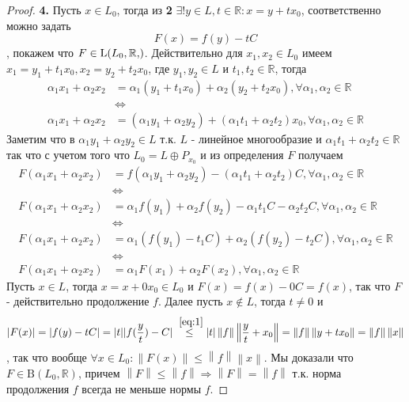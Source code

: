 \documentclass[12pt,a4paper]{article}
\theoremstyle{definition}
\newcommand{\Real}{\mathbb{R}}
\newcommand{\norm}[1]{\left\lVert#1\right\rVert}
\newcommand{\bounded}[2]{\textrm{B}(#1, #2)}
\newcommand{\linear}[2]{\textrm{L}(#1, #2)}
\begin{document}
\begin{proof}
	\textbf{4.} Пусть $x \in L_0$, тогда из \textbf{2} $\exists!{y \in L, t \in \Real}: x = y + tx_0$, соответственно можно задать $$F(x) = f(y) - tC$$, покажем что $F \in \linear{L_0, \Real}$. Действительно для $x_1, x_2 \in L_0$ имеем \newline $x_1 = y_1 + t_1 x_0, x_2 = y_2 + t_2 x_0$, где $y_1, y_2 \in L$ и $t_1, t_2 \in \Real$, тогда
	\begin{align*}
		\alpha_1 x_1 + \alpha_2 x_2 &= \alpha_1 (y_1 + t_1 x_0) + \alpha_2 (y_2 + t_2 x_0), \forall \alpha_1, \alpha_2 \in \Real  \\
		&\Leftrightarrow \\
		\alpha_1 x_1 + \alpha_2 x_2 &= (\alpha_1 y_1 + \alpha_2 y_2) + (\alpha_1 t_1 + \alpha_2 t_2)x_0, \forall \alpha_1, \alpha_2 \in \Real
	\end{align*}
	 Заметим что в $\alpha_1 y_1 + \alpha_2 y_2 \in L$ т.к. $L$ - линейное многообразие \newline и $\alpha_1 t_1 + \alpha_2 t_2 \in \Real$ так что с учетом того что $L_0 = L \oplus P_{x_0}$ и из определения $F$ получаем
	\begin{align*}
		F(\alpha_1 x_1 + \alpha_2 x_2) &= f(\alpha_1 y_1 + \alpha_2 y_2) - (\alpha_1 t_1 + \alpha_2 t_2)C, \forall \alpha_1, \alpha_2 \in \Real \\ &\Leftrightarrow \\    
		F(\alpha_1 x_1 + \alpha_2 x_2) &= \alpha_1 f(y_1) + \alpha_2 f(y_2) - \alpha_1 t_1 C - \alpha_2 t_2 C, \forall \alpha_1, \alpha_2 \in \Real \\ &\Leftrightarrow \\
		F(\alpha_1 x_1 + \alpha_2 x_2) &= \alpha_1 (f(y_1) - t_1 C) + \alpha_2 (f(y_2) - t_2 C), \forall \alpha_1, \alpha_2 \in \Real \\ &\Leftrightarrow \\
		F(\alpha_1 x_1 + \alpha_2 x_2) &= \alpha_1 F(x_1) + \alpha_2 F(x_2), \forall \alpha_1, \alpha_2 \in \Real
	\end{align*}
	Пусть $x\in L$, тогда $x = x + 0x_0 \in L_0$ и $F(x) = f(x) - 0C = f(x)$, так что $F$ - действительно продолжение $f$. Далее пусть $x \notin L$, тогда $t \neq 0$ и 
	$$|F(x)| = |f(y) - tC| = |t||f(\frac{y}{t}) - C| \overset{~\eqref{eq:1}}{\leq} |t|\norm{f}\norm{\frac{y}{t} + x_0} = \norm{f}\norm{y + tx_0} = \norm{f}\norm{x}$$, так что вообще $\forall x \in L_0: \norm{F(x)} \leq \norm{f}\norm{x}$. Мы доказали что $F \in \bounded{L_0}{\Real}$, причем $\norm{F} \leq \norm{f} \Rightarrow \norm{F} = \norm{f}$ т.к. норма продолжения $f$ всегда не меньше нормы $f$.
	\newline
	

\end{proof}
\end{document}
